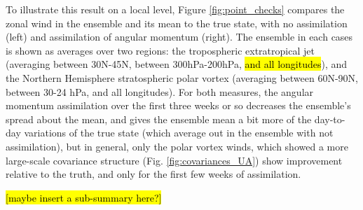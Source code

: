 To illustrate this result on a local level, Figure \ref{fig:point_checks} compares the zonal wind in the ensemble and its mean to the true state, with no assimilation (left) and assimilation of angular momentum (right). 
The ensemble in each cases is shown as averages over two regions: the tropospheric extratropical jet (averaging between 30N-45N, between 300hPa-200hPa, \hl{and all longitudes}), and the Northern Hemisphere stratospheric polar vortex (averaging between 60N-90N, between 30-24 hPa, and all longitudes).
For both measures, the angular momentum assimilation over the first three weeks or so decreases the ensemble's spread about the mean, and gives the ensemble mean a bit more of the day-to-day variations of the true state (which average out in the ensemble with not assimilation), but in general, only the polar vortex winds, which showed a more large-scale covariance structure (Fig. \ref{fig:covariances_UA}) show improvement relative to the truth, and only for the first few weeks of assimilation. 

\hl{[maybe insert a sub-summary here?]}
